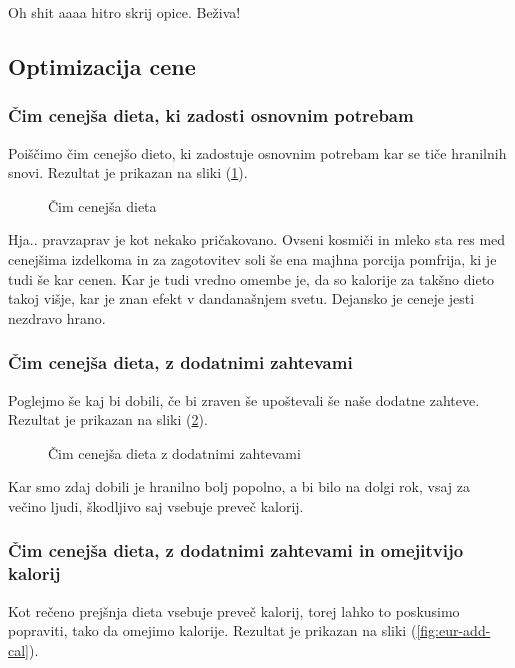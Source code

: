 \documentclass[a4paper]{article}
\begin{document}
Oh shit aaaa hitro skrij opice. Beživa!

\subsection{Optimizacija cene}
\subsubsection{Čim cenejša dieta, ki zadosti osnovnim potrebam}
Poiščimo čim cenejšo dieto, ki zadostuje osnovnim potrebam kar se tiče hranilnih 
snovi. Rezultat je prikazan na sliki (\ref{fig:eur}).

\begin{figure}[H]
    \centering
    \caption{Čim cenejša dieta}
    \label{fig:eur}
\end{figure}

Hja.. pravzaprav je kot nekako pričakovano. Ovseni kosmiči in mleko sta res med cenejšima 
izdelkoma in za zagotovitev soli še ena majhna porcija pomfrija, ki je tudi še kar cenen. Kar je
tudi vredno omembe je, da so kalorije za takšno dieto takoj višje, kar je znan efekt v dandanašnjem 
svetu. Dejansko je ceneje jesti nezdravo hrano.

\subsubsection{Čim cenejša dieta, z dodatnimi zahtevami}
Poglejmo še kaj bi dobili, če bi zraven še upoštevali še naše dodatne zahteve.
Rezultat je prikazan na sliki (\ref{fig:eur-add}).

\begin{figure}[H]
    \centering
    \caption{Čim cenejša dieta z dodatnimi zahtevami}
    \label{fig:eur-add}
\end{figure}

Kar smo zdaj dobili je hranilno bolj popolno, a bi bilo na dolgi rok, vsaj za večino ljudi,
škodljivo saj vsebuje preveč kalorij.

\subsubsection{Čim cenejša dieta, z dodatnimi zahtevami in omejitvijo kalorij}
Kot rečeno prejšnja dieta vsebuje preveč kalorij, torej lahko to poskusimo popraviti, tako da 
omejimo kalorije. Rezultat je prikazan na sliki (\ref{fig:eur-add-cal}).
\end{document}
